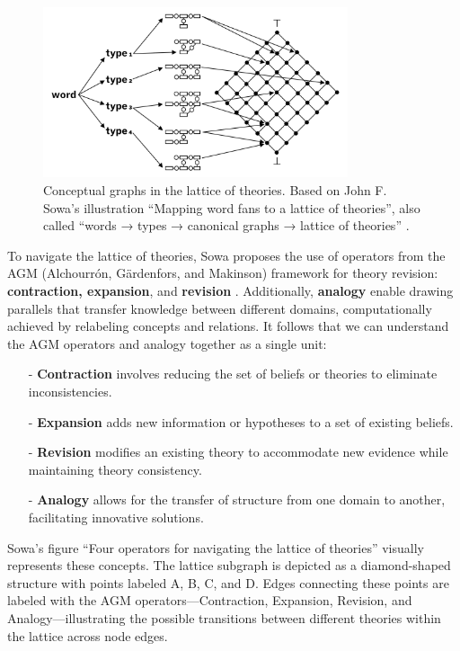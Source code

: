 \begin{figure}[h]
    \centering
    \includegraphics[width=0.8\textwidth]{figures/f1.png}
    \caption[Conceptual graphs in the lattice of theories. Based on John F. Sowa’s illustration]{Conceptual graphs in the lattice of theories. Based on John F. Sowa’s illustration ``Mapping word fans to a lattice of theories”, also called  ``words → types → canonical graphs → lattice of theories”  \citep[p. 12]{john_f_sowa_dynamic_2007}.}
    \label{f1}
\end{figure}
\par
\clearpage
\FloatBarrier

To navigate the lattice of theories, Sowa proposes the use of operators from the AGM (Alchourrón, Gärdenfors, and Makinson) framework for theory revision: \textbf{contraction, expansion}, and \textbf{revision} \citep{alchourron_logic_1985}. Additionally, \textbf{analogy} enable drawing parallels that transfer knowledge between different domains, computationally achieved by relabeling concepts and relations. It follows that we can understand the AGM operators and analogy together as a single unit:
\begin{itemize}
    \item[-] \textbf{Contraction} involves reducing the set of beliefs or theories to eliminate inconsistencies.
\item[-] \textbf{Expansion} adds new information or hypotheses to a set of existing beliefs.
\item[-] \textbf{Revision} modifies an existing theory to accommodate new evidence while maintaining theory consistency.
\item[-] \textbf{Analogy} allows for the transfer of structure from one domain to another, facilitating innovative solutions.
\end{itemize}


\par
Sowa's figure ``Four operators for navigating the lattice of theories” \citep[p. 11]{sowa_language_2007} visually represents these concepts. The lattice subgraph is depicted as a diamond-shaped structure with points labeled A, B, C, and D. Edges connecting these points are labeled with the AGM operators—Contraction, Expansion, Revision, and Analogy—illustrating the possible transitions between different theories within the lattice across node edges.

